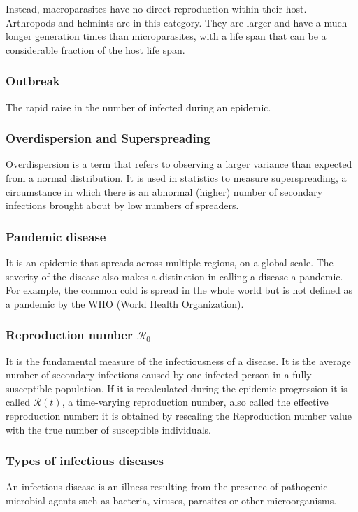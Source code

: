 Instead, macroparasites have no direct reproduction within their host. Arthropods and helmints are in this category. They are larger and have a much longer generation times than microparasites, with a life span that can be a considerable fraction of the host life span.


\subsubsection{Outbreak} The rapid raise in the number of infected during an epidemic.


\subsubsection{Overdispersion and Superspreading} Overdispersion is a term that refers to observing a larger variance than expected from a normal distribution. It is used in statistics to measure superspreading, a circumstance in which there is an abnormal (higher) number of secondary infections brought about by low numbers of spreaders.

\subsubsection{Pandemic disease} It is an epidemic that spreads across multiple regions, on a global scale. The severity of the disease also makes a distinction in calling a disease a pandemic. For example, the common cold is spread in the whole world but is not defined as a pandemic by the WHO (World Health Organization). 

\subsubsection{Reproduction number $\mathcal{R}_0$} It is the fundamental measure of the infectiousness of a disease. It is the average number of secondary infections caused by one infected person in a fully susceptible population. If it is recalculated during the epidemic progression it is called $\mathcal{R}(t)$, a time-varying reproduction number, also called the effective reproduction number: it is obtained by rescaling the Reproduction number value with the true number of susceptible individuals.

\subsubsection{Types of infectious diseases}An infectious disease is an illness resulting from the presence of pathogenic microbial agents such as bacteria, viruses, parasites or other microorganisms.

